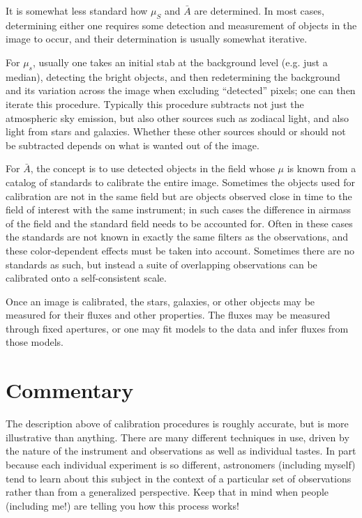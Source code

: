 It is somewhat less standard how $\mu_S$ and $\bar{A}$ are
determined. In most cases, determining either one requires some
detection and measurement of objects in the image to occur, and their
determination is usually somewhat iterative.

For $\mu_s$, usually one takes an initial stab at the background level
(e.g. just a median), detecting the bright objects, and then
redetermining the background and its variation across the image when
excluding ``detected'' pixels; one can then iterate this
procedure. Typically this procedure subtracts not just the atmospheric
sky emission, but also other sources such as zodiacal light, and also
light from stars and galaxies. Whether these other sources should or
should not be subtracted depends on what is wanted out of the image.

For $\bar{A}$, the concept is to use detected objects in the field
whose $\mu$ is known from a catalog of standards to calibrate the
entire image. Sometimes the objects used for calibration are not in
the same field but are objects observed close in time to the field of
interest with the same instrument; in such cases the difference in
airmass of the field and the standard field needs to be accounted
for. Often in these cases the standards are not known in exactly the
same filters as the observations, and these color-dependent effects
must be taken into account. Sometimes there are no standards as such,
but instead a suite of overlapping observations can be calibrated onto
a self-consistent scale.

Once an image is calibrated, the stars, galaxies, or other objects may
be measured for their fluxes and other properties. The fluxes may be
measured through fixed apertures, or one may fit models to the data
and infer fluxes from those models.

\section{Commentary}

The description above of calibration procedures is roughly accurate,
but is more illustrative than anything. There are many different
techniques in use, driven by the nature of the instrument and
observations as well as individual tastes. In part because each
individual experiment is so different, astronomers (including myself)
tend to learn about this subject in the context of a particular set of
observations rather than from a generalized perspective. Keep that in
mind when people (including me!) are telling you how this process
works!

